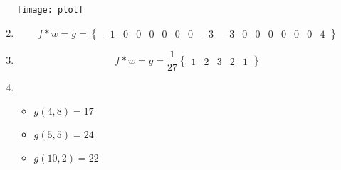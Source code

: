 \documentclass{article}
\begin{document}
\begin{enumerate}
\texttt{[image: plot]}

\item $$ f * w = g = \begin{Bmatrix} -1 & 0 & 0 & 0 & 0 & 0 & 0 & -3 & -3 & 0 &
0 & 0 & 0 & 0 & 0 & 4 \end{Bmatrix} $$

\item $$ f * w = g = \frac{1}{27} \begin{Bmatrix} 1 & 2 & 3 & 2 & 1
\end{Bmatrix} $$

\item

\begin{itemize}

\item $ g(4, 8) = 17 $
\item $ g(5, 5) = 24 $
\item $ g(10, 2) = 22 $

\end{itemize}

\end{enumerate}
\end{document}
